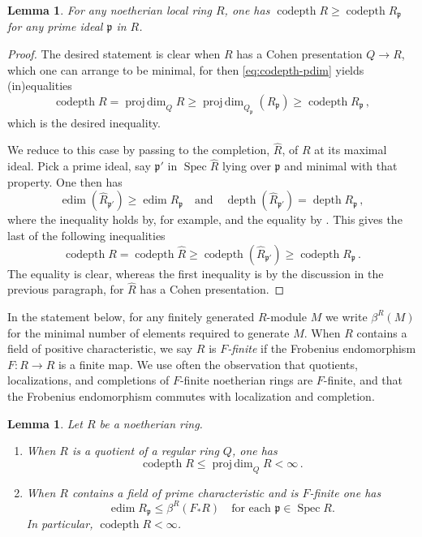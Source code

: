 \documentclass{amsart}
\newcommand{\fp}{\mathfrak{p}}
\newcommand{\codepth}{\operatorname{codepth}}
\newcommand{\depth}{\operatorname{depth}}
\newcommand{\edim}{\operatorname{edim}}
\newcommand{\pdim}{\operatorname{proj\,dim}}
\newcommand{\spec}{\operatorname{Spec}}
\newtheorem{lemma}[subsection]{Lemma}
\theoremstyle{definition}
\theoremstyle{remark}
\numberwithin{equation}{subsection}
\begin{document}
\begin{lemma}
For any noetherian local ring $R$, one has $\codepth R \ge \codepth R_\fp$ for any prime ideal $\fp$ in $R$. 
\end{lemma}

\begin{proof}
The desired statement is clear when $R$ has a Cohen presentation $Q\to R$, which one can arrange to be minimal, for then \eqref{eq:codepth-pdim} yields (in)equalities
\[
\codepth R = \pdim_QR \ge \pdim_{Q_\fp}(R_\fp) \ge \codepth R_\fp\,,
\]
which is the desired inequality. 

We reduce to this case by passing to the completion, $\widehat R$, of $R$ at its maximal ideal. Pick a prime ideal, say $\fp'$ in $\spec\widehat R$ lying over $\fp$ and minimal with that property. One then has
\[
\edim (\widehat R_{\fp'}) \ge \edim R_\fp \quad\text{and}\quad \depth (\widehat R_{\fp'}) = \depth R_\fp\,,
\]
where the inequality holds by, for example, \cite{Lech:1964} and the equality by \cite[Proposition~1.2.16]{Bruns/Herzog:1998}. This gives the last of the following inequalities
\[
\codepth R = \codepth \widehat R \ge \codepth (\widehat R_{\fp'}) \ge \codepth R_{\fp}\,.
\]
The equality is clear, whereas the first inequality is by the discussion in the previous paragraph, for $\widehat R$ has a Cohen presentation.
\end{proof}

In the statement below, for any finitely generated $R$-module $M$ we write $\beta^R(M)$ for the minimal number of elements required to generate $M$. When $R$ contains a field of positive characteristic, we say $R$ is \emph{$F$-finite} if the Frobenius endomorphism $F\colon R\to R$ is a finite map. We use often the observation that quotients, localizations, and completions of $F$-finite noetherian rings are $F$-finite, and that the Frobenius endomorphism commutes with localization and completion.

\begin{lemma}
\label{le:codepth}
Let $R$ be a noetherian ring.
\begin{enumerate}[\quad\rm(1)]
\item When $R$ is a quotient of a regular ring $Q$, one has
\[
\codepth R\le \pdim_QR<\infty\,.
\]
\item
When $R$ contains a field of prime characteristic and is $F $-finite one has
\[
\edim R_\fp \le \beta^R(F _*R)\quad\text{for each $\fp\in\spec R$.}
\]
In particular, $\codepth R<\infty$.
\end{enumerate}
\end{lemma}
\end{document}
